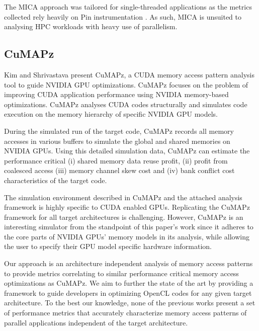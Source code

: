 \documentclass[review=false, sigchi]{acmart}
\begin{document}
	The MICA approach was tailored for single-threaded applications as the metrics collected rely heavily on Pin instrumentation \cite{luk2005pin}. As such, MICA is unsuited to analysing HPC workloads with heavy use of parallelism.

	\subsection{CuMAPz}
	
	Kim and Shrivastava \cite{kim2011cumapz} present CuMAPz, a CUDA memory access pattern analysis tool to guide NVIDIA GPU optimizations. CuMAPz focuses on the problem of improving CUDA application performance using NVIDIA memory-based optimizations. CuMAPz analyses CUDA codes structurally and simulates code execution on the memory hierarchy of specific NVIDIA GPU models.
	
	During the simulated run of the target code, CuMAPz records all memory accesses in various buffers to simulate the global and shared memories on NVIDIA GPUs. Using this detailed simulation data, CuMAPz can estimate the performance critical (i) shared memory data reuse profit, (ii) profit from coalesced access (iii) memory channel skew cost and (iv) bank conflict cost characteristics of the target code.
	
	The simulation environment described in CuMAPz and the attached analysis framework is highly specific to CUDA enabled GPUs. Replicating the CuMAPz framework for all target architectures is challenging. However, CuMAPz is an interesting simulator from the standpoint of this paper's work since it adheres to the core parts of NVIDIA GPUs' memory models in its analysis, while allowing the user to specify their GPU model specific hardware information.
	
	Our approach is an architecture independent analysis of memory access patterns to provide metrics correlating to similar performance critical memory access optimizations as CuMAPz. We aim to further the state of the art by providing a framework to guide developers in optimizing OpenCL codes for any given target architecture. To the best our knowledge, none of the previous works present a set of performance metrics that accurately characterize memory access patterns of parallel applications independent of the target architecture.
	
\end{document}
